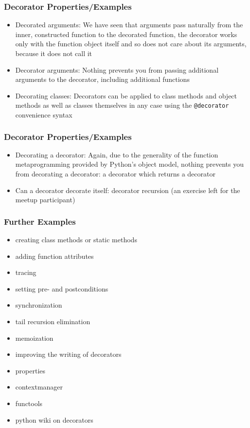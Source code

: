 \documentclass{beamer}
\begin{document}
\begin{frame}
\frametitle{Decorator Properties/Examples}
\begin{itemize}
  \item<1->{Decorated arguments: We have seen that arguments pass naturally from the inner, constructed function to the decorated function, the decorator works only with the function object itself and so does not care about its arguments, because it does not call it}
  \item<2->{Decorator arguments: Nothing prevents you from passing additional arguments to the decorator, including additional functions}
  \item<3->{Decorating classes: Decorators can be applied to class methods and object methods as well as classes themselves in any case using the \texttt{@decorator} convenience syntax}
\end{itemize}
\end{frame}

\begin{frame}
\frametitle{Decorator Properties/Examples}
\begin{itemize}
  \item<1->{Decorating a decorator: Again, due to the generality of the function metaprogramming provided by Python's object model, nothing prevents you from decorating a decorator: a decorator which returns a decorator}
  \item<2->{Can a decorator decorate itself: decorator recursion (an exercise left for the meetup participant)}
\end{itemize}
\end{frame}

\begin{frame}
\frametitle{Further Examples}
\begin{itemize}
  \item{creating class methods or static methods}
  \item{adding function attributes}
  \item{tracing}
  \item{setting pre- and postconditions}
  \item{synchronization}
  \item{tail recursion elimination}
  \item{memoization}
  \item{improving the writing of decorators}
  \item{properties}
  \item{contextmanager}
  \item{functools}
  \item{python wiki on decorators}
\end{itemize}
\end{frame}
\end{document}
